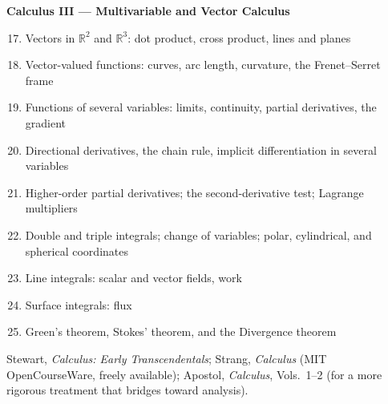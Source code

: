 \medskip
\noindent\textbf{Calculus III --- Multivariable and Vector Calculus}
\begin{enumerate}
  \setcounter{enumi}{16}
  \item Vectors in $\mathbb{R}^2$ and $\mathbb{R}^3$: dot
        product, cross product, lines and planes
  \item Vector-valued functions: curves, arc length, curvature,
        the Frenet--Serret frame
  \item Functions of several variables: limits, continuity,
        partial derivatives, the gradient
  \item Directional derivatives, the chain rule, implicit
        differentiation in several variables
  \item Higher-order partial derivatives; the second-derivative
        test; Lagrange multipliers
  \item Double and triple integrals; change of variables;
        polar, cylindrical, and spherical coordinates
  \item Line integrals: scalar and vector fields, work
  \item Surface integrals: flux
  \item Green's theorem, Stokes' theorem, and the Divergence
        theorem
\end{enumerate}

\begin{remark*}
Stewart, \textit{Calculus: Early Transcendentals};
Strang, \textit{Calculus} (MIT OpenCourseWare, freely available);
Apostol, \textit{Calculus}, Vols.~1--2 (for a more rigorous
treatment that bridges toward analysis).
\end{remark*}



%

% 

% 
% 
% 
% 
%
% 
% 
% 
% 
% 
% 
% 
%
% 
% 
% 
% 
% 
% 
